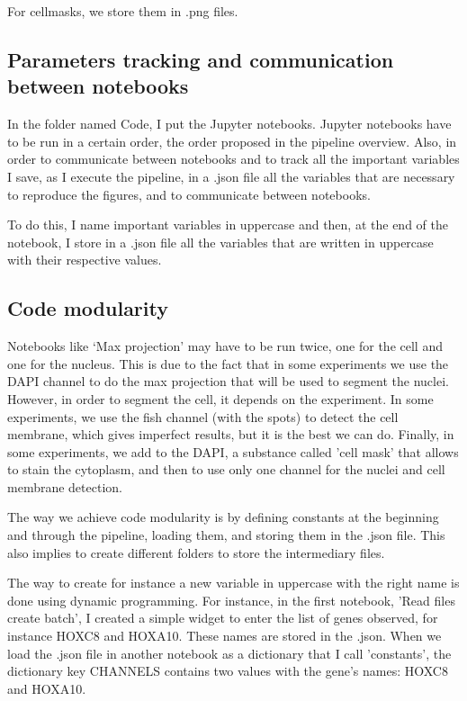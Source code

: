 \documentclass[24pt]{article}
\begin{document}
 
 For cellmasks, we store them in .png files.

 
 
\subsection{Parameters tracking and communication between notebooks}

In the folder named Code, I put the Jupyter notebooks. Jupyter notebooks have to be run in a certain order, the order proposed in the pipeline overview. Also, in order to communicate between notebooks and to track all the important variables I save, as I execute the pipeline,  in a .json file all the variables that are necessary to reproduce the figures, and to communicate between notebooks. 

To do this, I name important variables in uppercase and then, at the end of the notebook, I store in a .json file all the variables that are written in uppercase with their respective values.   
 
 
 
 
\subsection{Code modularity}

         Notebooks like ‘Max projection’ may have to be run twice, one for the cell and one for the nucleus. This is due to the fact that in some experiments we use the DAPI channel to do the max projection that will be used to segment the nuclei. However, in order to segment the cell, it depends on the experiment. In some experiments, we use the fish channel (with the spots) to detect the cell membrane, which gives imperfect results, but it is the best we can do. Finally, in some experiments, 
we add to the DAPI, a substance called  'cell mask' that allows to stain the cytoplasm, and then to use only one channel for the nuclei and cell membrane detection.

The way we achieve code modularity is by defining constants at the beginning and through  the pipeline, loading them, and storing them in the .json file.  This also implies to create different 
folders to store the intermediary files.


The way to create for instance a new variable in uppercase with the right name is done using dynamic programming. For instance, in the first notebook, 'Read files create batch', I created a simple widget to enter the list of genes observed, for instance HOXC8 and HOXA10. These names are stored in the .json. When we load the .json file in another notebook as a dictionary that I call 'constants', the dictionary key CHANNELS contains two values with the gene's names: HOXC8 and HOXA10.
\end{document}
